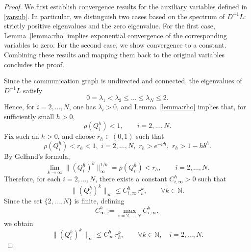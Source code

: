 \documentclass[10pt,a4paper]{amsart}
\begin{document}
\begin{proof}
We first establish convergence results for the auxiliary variables defined in \eqref{varsub}.
In particular, we distinguish two cases based on the spectrum of \(D^{-1}L\): strictly positive eigenvalues and the zero eigenvalue. For the first case, Lemma~\ref{lemma:rho} implies exponential convergence of the corresponding variables to zero. For the second case, we show convergence to a constant.
Combining these results and mapping them back to the original variables concludes the proof.

Since the communication graph is undirected and connected, the eigenvalues of \(D^{-1}L\) satisfy
\[
0=\lambda_1<\lambda_2\le \dots \le \lambda_N\le 2.
\]
Hence, for \(i=2,\dots,N\), one has \(\lambda_i>0\), and Lemma~\ref{lemma:rho} implies that, for sufficiently small \(h>0\),
\[
\rho(Q_i^h)<1,\qquad i=2,\dots,N.
\]
Fix such an \(h>0\), and choose \(r_h\in(0,1)\) such that
\[
\rho(Q_i^h)<r_h<1,\,\, i=2,\dots,N,
\,\,
r_h>e^{-\nu h},
\,\,
r_h>1-hb^h.
\]
By Gelfand's formula,
\[
\lim_{k\to\infty}\|(Q_i^h)^k\|_\infty^{1/k}
=
\rho(Q_i^h)
<r_h,
\qquad i=2,\dots,N.
\]
Therefore, for each \(i=2,\dots,N\), there exists a constant \(C_{i,\infty}^h>0\) such that
\[
\|(Q_i^h)^k\|_\infty \le C_{i,\infty}^h\, r_h^k,
\qquad \forall k\in\mathbb N.
\]
Since the set \(\{2,\dots,N\}\) is finite, defining
\[
C_\infty^h:=\max_{i=2,\dots,N} C_{i,\infty}^h,
\]
we obtain
\[
\|(Q_i^h)^k\|_\infty \le C_\infty^h\, r_h^k,
\qquad \forall k\in\mathbb N,\quad i=2,\dots,N.
\]


\end{proof}
\end{document}
